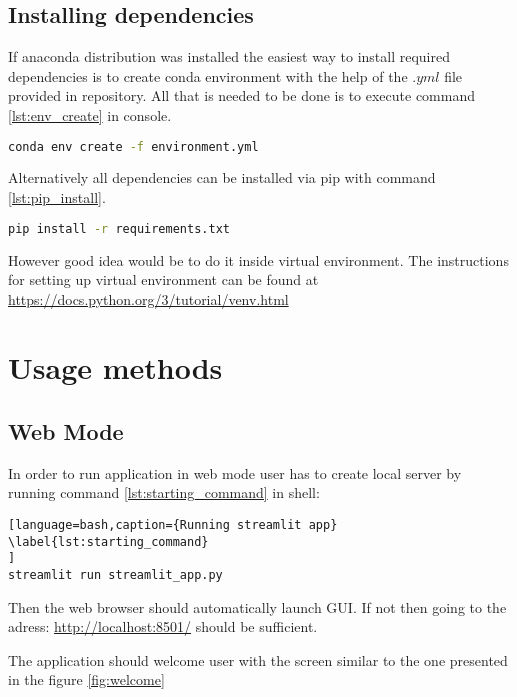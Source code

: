 \documentclass[a4paper,twoside,12pt]{book}
\begin{document}
\subsection{Installing dependencies}

If anaconda distribution was installed the easiest way to install required dependencies is to create conda environment with the help of the $.yml$ file provided in repository. All that is needed to be done is to execute command \ref{lst:env_create} in console.

\begin{lstlisting}[language=bash,caption={installation of anaconda environment from console}, label={lst:env_create}]
conda env create -f environment.yml
\end{lstlisting}

Alternatively all dependencies can be installed via pip with command \ref{lst:pip_install}.  

\begin{lstlisting}[language=bash,caption={installation with pip}, label={lst:pip_install}]
pip install -r requirements.txt
\end{lstlisting}

However good idea would be to do it inside virtual environment. The instructions for setting up virtual environment can be found at \url{https://docs.python.org/3/tutorial/venv.html}

\section{Usage methods}

\subsection{Web Mode}

In order to run application in web mode user has to create local server by running command \ref{lst:starting_command} in shell:

\begin{lstlisting}[language=bash,caption={Running streamlit app}
\label{lst:starting_command}
]
streamlit run streamlit_app.py
\end{lstlisting}

Then the web browser should automatically launch GUI. If not then going to the adress: \url{http://localhost:8501/} should be sufficient.

The application should welcome user with the screen similar to the one presented in the figure \ref{fig:welcome}
\end{document}
